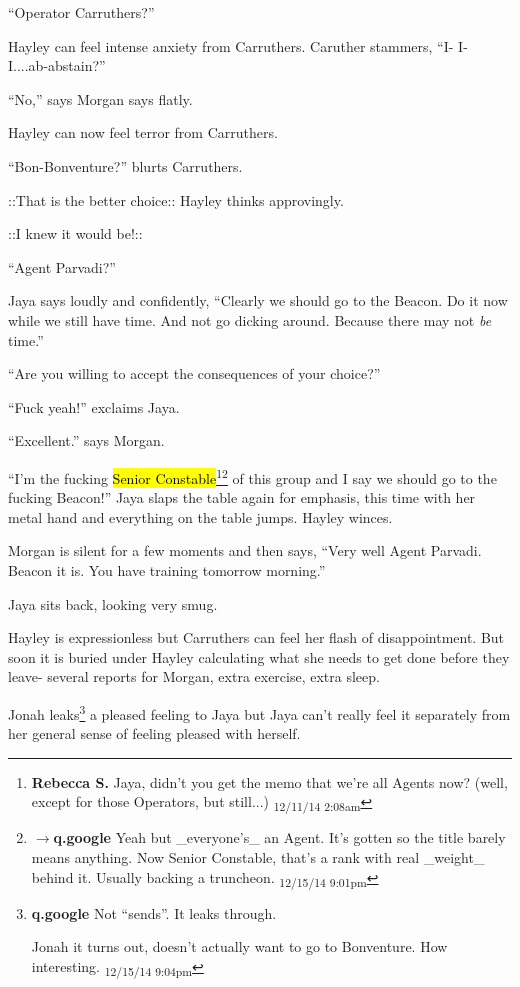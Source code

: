 ``Operator Carruthers?''

Hayley can feel intense anxiety from Carruthers.  Caruther stammers, ``I- I- I....ab-abstain?''

``No,'' says Morgan says flatly.

Hayley can now feel terror from Carruthers.

``Bon-Bonventure?'' blurts Carruthers.

 {\color[RGB]{255,153,0}::That is the better choice::}  Hayley thinks approvingly.

 {\color[RGB]{153,0,255}::I knew it would be!::} 

``Agent Parvadi?''

Jaya says loudly and confidently, ``Clearly we should go to the Beacon.  Do it now while we still have time.  And not go dicking around.  Because there may not \textit{be} time.''

``Are you willing to accept the consequences of your choice?''

``Fuck yeah!'' exclaims Jaya.

``Excellent.'' says Morgan.

``I'm the fucking \hl{Senior Constable}\footnote{\textbf{Rebecca S. }Jaya, didn't you get the memo that we're all Agents now? (well, except for those Operators, but still...) \textsubscript{12/11/14 2:08am}}\footnote{$\rightarrow$\textbf{q.google }Yeah but \_everyone's\_ an Agent.  It's gotten so the title barely means anything.  Now Senior Constable, that's a rank with real \_weight\_ behind it.  Usually backing a truncheon. \textsubscript{12/15/14 9:01pm}} of this group and I say we should go to the fucking Beacon!'' Jaya slaps the table again for emphasis, this time with her metal hand and everything on the table jumps. Hayley winces.

Morgan is silent for a few moments and then says, ``Very well Agent Parvadi.  Beacon it is.  You have training tomorrow morning.''

Jaya sits back, looking very smug.

Hayley is expressionless but Carruthers can feel her flash of disappointment.  But soon it is buried under Hayley calculating what she needs to get done before they leave- several reports for Morgan, extra exercise, extra sleep.

Jonah leaks\footnote{\textbf{q.google }Not ``sends''.  It leaks through.

Jonah it turns out, doesn't actually want to go to Bonventure.  How interesting. \textsubscript{12/15/14 9:04pm}} a pleased feeling to Jaya but Jaya can't really feel it separately from her general sense of feeling pleased with herself.



